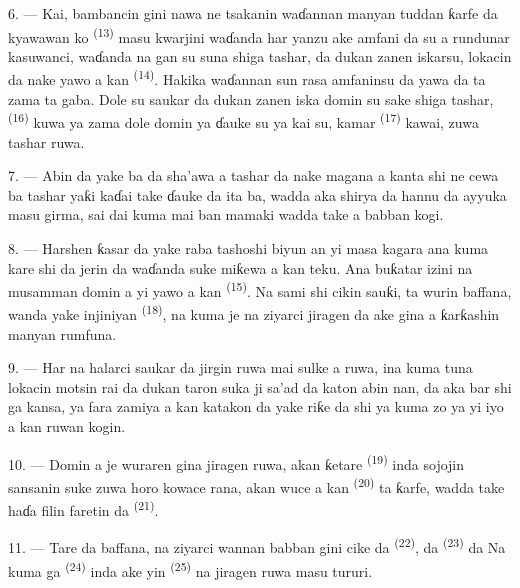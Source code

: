 6. --- Kai, bambancin gini nawa ne tsakanin waɗannan manyan tuddan
ƙarfe da kyawawan  ko  \textsuperscript{(13)} masu kwarjini waɗanda har
yanzu ake amfani da su a rundunar kasuwanci, waɗanda na gan su suna
shiga tashar, da dukan zanen iskarsu, lokacin da nake yawo a kan
 \textsuperscript{(14)}. Hakika waɗannan sun rasa
amfaninsu da yawa  da  ta zama ta gaba.
Dole su saukar da dukan zanen iska domin su sake shiga tashar,
 \textsuperscript{(16)} kuwa ya zama dole domin ya
ɗauke su ya kai su, kamar 
\textsuperscript{(17)} kawai, zuwa tashar ruwa.

\VUsaut{3.0mm}
\VUsaut{3.0mm}

7. --- Abin da yake ba da sha’awa a tashar da nake magana a kanta shi
ne cewa ba tashar yaƙi kaɗai take ɗauke da ita ba, wadda aka shirya da
hannu da ayyuka masu girma, sai dai kuma  mai
ban mamaki wadda take a  babban kogi.

8. --- Harshen ƙasar da yake raba tashoshi biyun an yi masa kagara ana
kuma kare shi da jerin  da  waɗanda suke miƙewa a kan teku. Ana buƙatar izini na musamman
domin a yi yawo a kan  \textsuperscript{(15)}. Na
sami shi cikin sauƙi, ta wurin baffana, wanda yake injiniyan
 \textsuperscript{(18)}, na kuma je na
ziyarci jiragen da ake gina a ƙarƙashin manyan rumfuna.

9. --- Har na halarci saukar da jirgin ruwa mai sulke a ruwa, ina kuma
tuna lokacin motsin rai da dukan taron suka ji sa’ad da katon abin nan,
da aka bar shi ga kansa, ya fara zamiya a kan katakon da yake riƙe da
shi ya kuma zo ya yi iyo a kan ruwan kogin.

10. --- Domin a je wuraren gina jiragen ruwa, akan ƙetare  \textsuperscript{(19)} inda sojojin sansanin suke zuwa horo kowace
rana, akan wuce a kan  \textsuperscript{(20)} ta
ƙarfe, wadda take haɗa filin faretin da 
\textsuperscript{(21)}.

\VUsaut{3.0mm}
\VUsaut{3.0mm}

11. --- Tare da baffana, na ziyarci wannan babban gini cike da
 \textsuperscript{(22)}, da 
\textsuperscript{(23)} da  Na kuma ga  \textsuperscript{(24)} inda ake yin  \textsuperscript{(25)} na jiragen ruwa masu tururi.

